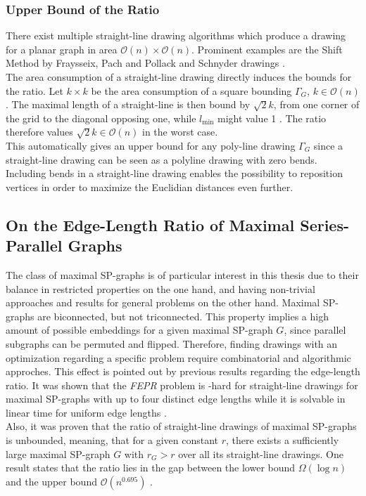 \subsubsection*{Upper Bound of the Ratio}
There exist multiple straight-line drawing algorithms which produce a drawing for a planar graph in area $\mathcal{O}(n)\times\mathcal{O}(n)$. Prominent examples are the Shift Method by Fraysseix, Pach and Pollack \cite [P. 202ff]{Planar_straight_line_drawing_algorithms} and Schnyder drawings \cite[P. 3]{Schnyder_drawings}.\\
The area consumption of a straight-line drawing directly induces the bounds for the ratio. Let $k\times k$ be the area consumption of a square bounding $\Gamma_G$, $k\in \mathcal{O}(n)$. The maximal length of a straight-line is then bound by $\sqrt{2}k$, from one corner of the grid to the diagonal opposing one, while $l_{\min}$ might value 1 \UL. The ratio therefore values $\sqrt{2}k \in \mathcal{O}(n)$ in the worst case.\\
This automatically gives an upper bound for any poly-line drawing $\Gamma_G$ since a straight-line drawing can be seen as a polyline drawing with zero bends. Including bends in a straight-line drawing enables the possibility to reposition vertices in order to maximize the Euclidian distances even further.


\subsection{On the Edge-Length Ratio of Maximal Series-Parallel Graphs}

The class of maximal SP-graphs is of particular interest in this thesis due to their balance in restricted properties on the one hand, and having non-trivial approaches and results for general problems on the other hand. Maximal SP-graphs are biconnected, but not triconnected. This property implies a high amount of possible embeddings for a given maximal SP-graph $G$, since parallel subgraphs can be permuted and flipped. Therefore, finding drawings with an optimization regarding a specific problem require combinatorial and algorithmic approches. This effect is pointed out by previous results regarding the edge-length ratio. It was shown that the \emph{FEPR} problem is \NP-hard for straight-line drawings for maximal SP-graphs with up to four distinct edge lengths while it is solvable in linear time for uniform edge lengths \cite[P. 1]{straight-line_2-trees}.\\
Also, it was proven that the ratio of straight-line drawings of maximal SP-graphs is unbounded, meaning, that for a given constant $r$, there exists a sufficiently large maximal SP-graph $G$ with $r_G > r$ over all its straight-line drawings. One result states that the ratio lies in the gap between the lower bound $\Omega(\log n)$ and the upper bound $\mathcal{O}(n^{0.695})$ \cite[P. 2]{edge-length-ratio-2tree}.

